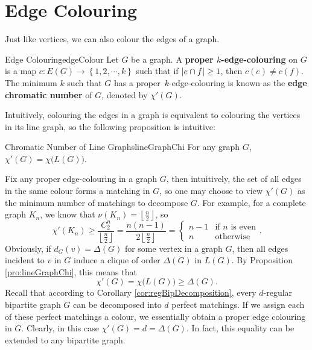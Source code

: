 \documentclass[math]{amznotes}
\theoremstyle{remark}
\begin{document}
\section{Edge Colouring}
Just like vertices, we can also colour the edges of a graph. 
\begin{dfnbox}{Edge Colouring}{edgeColour}
    Let $G$ be a graph. A {\color{red} \textbf{proper $k$-edge-colouring}} on $G$ is a map $c \colon E(G) \to \left\{1, 2, \cdots, k\right\}$ such that if ${\left\lvert {e \cap f} \right\rvert} \geq 1$, then $c(e) \neq c(f)$. The minimum $k$ such that $G$ has a proper~$k$-edge-colouring is known as the {\color{red} \textbf{edge chromatic number}} of $G$, denoted by $\chi'(G)$.
\end{dfnbox}
Intuitively, colouring the edges in a graph is equivalent to colouring the vertices in its line graph, so the following proposition is intuitive:
\begin{probox}{Chromatic Number of Line Graphs}{lineGraphChi}
    For any graph $G$, $\chi'(G) = \chi\bigl(L(G)\bigr)$.
\end{probox}
Fix any proper edge-colouring in a graph $G$, then intuitively, the set of all edges in the same colour forms a matching in $G$, so one may choose to view $\chi'(G)$ as the minimum number of matchings to decompose $G$. For example, for a complete graph $K_n$, we know that $\nu(K_n) = \left\lfloor\frac{n}{2}\right\rfloor$, so 
\begin{equation*}
    \chi'(K_n) \geq \frac{C^n_2}{\left\lfloor\frac{n}{2}\right\rfloor} = \frac{n(n - 1)}{2\left\lfloor\frac{n}{2}\right\rfloor} = \begin{cases}
        n - 1 & \textrm{if } n \textrm{ is even} \\
        n & \textrm{otherwise}
    \end{cases}.
\end{equation*}
Obviously, if $d_G(v) = \Delta(G)$ for some vertex in a graph $G$, then all edges incident to $v$ in $G$ induce a clique of order $\Delta(G)$ in $L(G)$. By Proposition \ref{pro:lineGraphChi}, this means that 
\begin{equation*}
    \chi'(G) = \chi\bigl(L(G)\bigr) \geq \Delta(G).
\end{equation*}
Recall that according to Corollary \ref{cor:regBipDecomposition}, every $d$-regular bipartite graph $G$ can be decomposed into $d$ perfect matchings. If we assign each of these perfect matchings a colour, we essentially obtain a proper edge colouring in $G$. Clearly, in this case $\chi'(G) = d = \Delta(G)$. In fact, this equality can be extended to any bipartite graph.
\end{document}
